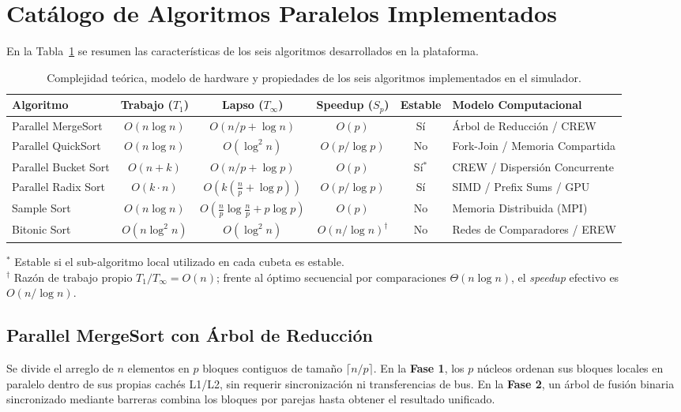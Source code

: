 \documentclass[11pt,letterpaper,oneside]{article}
\begin{document}
\section{Catálogo de Algoritmos Paralelos Implementados}

En la Tabla~\ref{tab:complejidades} se resumen las características de los seis algoritmos desarrollados en la plataforma.

\begin{table}[htbp]
\centering
\small
\caption{Complejidad teórica, modelo de hardware y propiedades de los seis algoritmos implementados en el simulador.}
\label{tab:complejidades}
\begin{tabularx}{\textwidth}{lccccX}
\toprule
\textbf{Algoritmo} & \textbf{Trabajo ($T_1$)} & \textbf{Lapso ($T_\infty$)} & \textbf{Speedup ($S_p$)} & \textbf{Estable} & \textbf{Modelo Computacional}\\
\midrule
Parallel MergeSort & $O(n \log n)$ & $O(n/p + \log n)$ & $O(p)$ & Sí & Árbol de Reducción / CREW\\
Parallel QuickSort & $O(n \log n)$ & $O(\log^2 n)$ & $O(p / \log p)$ & No & Fork-Join / Memoria Compartida\\
Parallel Bucket Sort & $O(n + k)$ & $O(n/p + \log p)$ & $O(p)$ & Sí$^*$ & CREW / Dispersión Concurrente\\
Parallel Radix Sort & $O(k \cdot n)$ & $O(k(\frac{n}{p} + \log p))$ & $O(p / \log p)$ & Sí & SIMD / Prefix Sums / GPU\\
Sample Sort & $O(n \log n)$ & $O(\frac{n}{p}\log\frac{n}{p} + p\log p)$ & $O(p)$ & No & Memoria Distribuida (MPI)\\
Bitonic Sort & $O(n \log^2 n)$ & $O(\log^2 n)$ & $O(n / \log n)^\dagger$ & No & Redes de Comparadores / EREW\\
\bottomrule
\end{tabularx}
\par\smallskip
\begin{minipage}{\textwidth}
\footnotesize
\raggedright
$^*$ Estable si el sub-algoritmo local utilizado en cada cubeta es estable.\\
$^\dagger$ Razón de trabajo propio $T_1 / T_\infty = O(n)$; frente al óptimo secuencial por comparaciones $\Theta(n \log n)$, el \emph{speedup} efectivo es $O(n / \log n)$.
\end{minipage}
\end{table}

\subsection{Parallel MergeSort con Árbol de Reducción}
Se divide el arreglo de $n$ elementos en $p$ bloques contiguos de tamaño $\lceil n/p \rceil$. En la \textbf{Fase 1}, los $p$ núcleos ordenan sus bloques locales en paralelo dentro de sus propias cachés L1/L2, sin requerir sincronización ni transferencias de bus. En la \textbf{Fase 2}, un árbol de fusión binaria sincronizado mediante barreras combina los bloques por parejas hasta obtener el resultado unificado.
\end{document}
